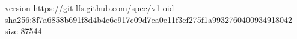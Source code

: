 version https://git-lfs.github.com/spec/v1
oid sha256:8f7a6858b691f8d4b4e6c917c09d7ea0e11f3ef275f1a9932760400934918042
size 87544
